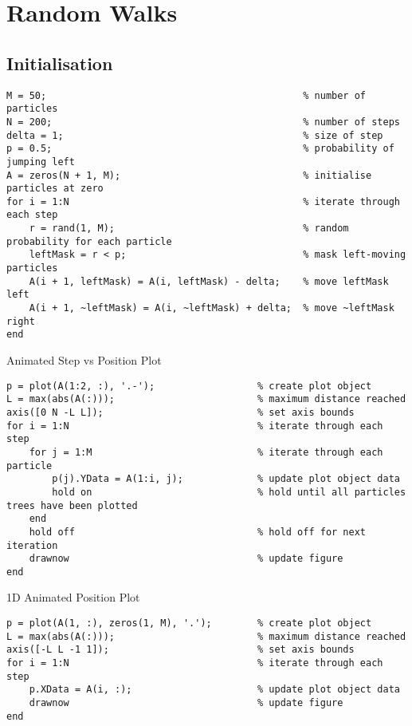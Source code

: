\documentclass{article}
\begin{document}
\section*{Random Walks}
\subsection*{Initialisation}
\begin{lstlisting}
M = 50;                                             % number of particles
N = 200;                                            % number of steps
delta = 1;                                          % size of step
p = 0.5;                                            % probability of jumping left
A = zeros(N + 1, M);                                % initialise particles at zero
for i = 1:N                                         % iterate through each step
    r = rand(1, M);                                 % random probability for each particle
    leftMask = r < p;                               % mask left-moving particles
    A(i + 1, leftMask) = A(i, leftMask) - delta;    % move leftMask left    
    A(i + 1, ~leftMask) = A(i, ~leftMask) + delta;  % move ~leftMask right
end
\end{lstlisting}
Animated Step vs Position Plot
\begin{lstlisting}
p = plot(A(1:2, :), '.-');                  % create plot object
L = max(abs(A(:)));                         % maximum distance reached
axis([0 N -L L]);                           % set axis bounds
for i = 1:N                                 % iterate through each step
    for j = 1:M                             % iterate through each particle
        p(j).YData = A(1:i, j);             % update plot object data
        hold on                             % hold until all particles trees have been plotted 
    end
    hold off                                % hold off for next iteration
    drawnow                                 % update figure
end
\end{lstlisting}
1D Animated Position Plot
\begin{lstlisting}
p = plot(A(1, :), zeros(1, M), '.');        % create plot object
L = max(abs(A(:)));                         % maximum distance reached
axis([-L L -1 1]);                          % set axis bounds
for i = 1:N                                 % iterate through each step
    p.XData = A(i, :);                      % update plot object data
    drawnow                                 % update figure
end
\end{lstlisting}
\end{document}
